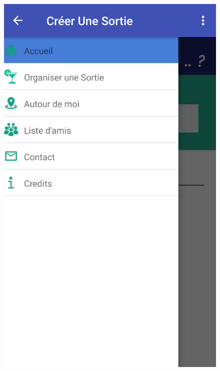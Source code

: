 \documentclass[a4paper, 12pt, notitlepage]{article} %
\begin{document}
\begin{figure}[!htb]
{    \includegraphics[height=0.4\textheight]{Interface_Menu.png}
    \label{interface:MenuAccueil}}
    \hfill
\end{figure}
\vfill
\end{document}
